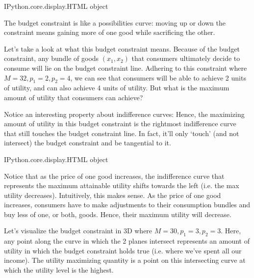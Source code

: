 \documentclass[letterpaper,10pt,english]{jupyterBook}
\begin{document}
\begin{sphinxVerbatim}[commandchars=\\\{\}]
\PYGZlt{}IPython.core.display.HTML object\PYGZgt{}
\end{sphinxVerbatim}

\sphinxAtStartPar
The budget constraint is like a possibilities curve: moving up or down the constraint means gaining more of one good while sacrificing the other.

\sphinxAtStartPar
Let’s take a look at what this budget constraint means. Because of the budget constraint, any bundle of goods \((x_1,x_2)\) that consumers ultimately decide to consume will lie on the budget constraint line. Adhering to this constraint where \(M=32, p_1 = 2, p_2 = 4\), we can see that consumers will be able to achieve 2 units of utility, and can also achieve 4 units of utility. But what is the maximum amount of utility that consumers can achieve?

\sphinxAtStartPar
Notice an interesting property about indifference curves:  Hence, the maximizing amount of utility in this budget constraint is the rightmost indifference curve that still touches the budget constraint line. In fact, it’ll only ‘touch’ (and not intersect) the budget constraint and be tangential to it.

\begin{sphinxVerbatim}[commandchars=\\\{\}]
\PYGZlt{}IPython.core.display.HTML object\PYGZgt{}
\end{sphinxVerbatim}

\sphinxAtStartPar
Notice that as the price of one good increases, the indifference curve that represents the maximum attainable utility shifts towards the left (i.e. the max utility decreases). Intuitively, this makes sense. As the price of one good increases, consumers have to make adjustments to their consumption bundles and buy less of one, or both, goods. Hence, their maximum utility will decrease.

\sphinxAtStartPar
Let’s visualize the budget constraint in 3D where \(M=30, p_1=3, p_2=3\). Here, any point along the curve in which the 2 planes intersect represents an amount of utility in which the budget constraint holds true (i.e. where we’ve spent all our income). The utility maximizing quantity is a point on this intersecting curve at which the utility level is the highest.
\end{document}
